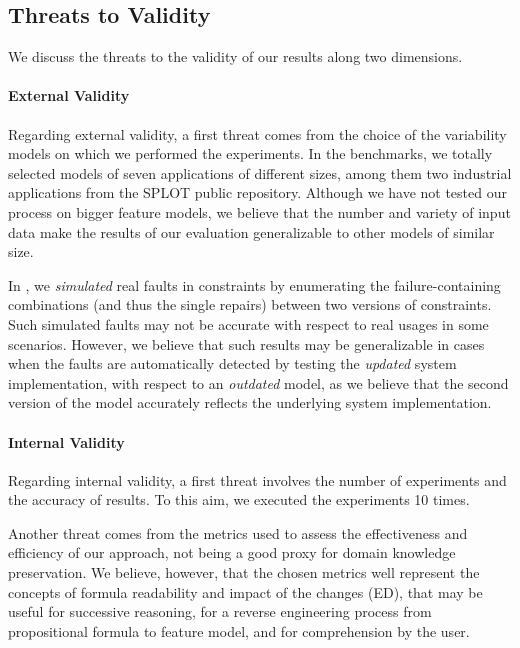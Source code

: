 \begin{tikzborder}{\cite{Gargantini16:validation}}
\begin{tikzborder}{\cite{gargantini_combinatorial_2017}}
\begin{tikzborder}{\cite{gargantini_combinatorial_2017}}
\begin{tikzborder}{\cite{garn2019}}
\begin{tikzborder}{\cite{arcaini2019achieving}}
\begin{tikzborder}{\cite{arcaini2019varivolution}}
		\subsection{Threats to Validity}\label{sec:threats}
		\bb We discuss the threats to the validity of our results along two dimensions.
		
		\paragraph{External Validity}
		Regarding external validity, a first threat comes from the choice of the variability models on which we performed the experiments. In the benchmarks, we totally selected models of seven applications of different sizes, among them two industrial applications from the SPLOT public repository. Although we have not tested our process on bigger feature models, we believe that the number and variety of input data make the results of our evaluation generalizable to other models of similar size.
		
		In \benchReal, we \textit{simulated} real faults in constraints by enumerating the failure-containing combinations (and thus the single repairs) between two versions of constraints. Such simulated faults may not be accurate with respect to real usages in some scenarios. However, we believe that such results may be generalizable in cases when the faults are automatically detected by testing the \textit{updated} system implementation, with respect to an \textit{outdated} model, as we believe that the second version of the model accurately reflects the underlying system implementation.
		
		\paragraph{Internal Validity}
		Regarding internal validity, a first threat involves the number of experiments and the accuracy of results. To this aim, we executed the experiments 10 times.
		
		Another threat comes from the metrics used to assess the effectiveness and efficiency of our approach, not being a good proxy for domain knowledge preservation. We believe, however, that the chosen metrics well represent the concepts of formula readability and impact of the changes (ED), that may be useful for successive reasoning, for a reverse engineering process from propositional formula to feature model, and for comprehension by the user.
		
		\smallskip
		

\end{tikzborder}
\end{tikzborder}
\end{tikzborder}
\end{tikzborder}
\end{tikzborder}
\end{tikzborder}
